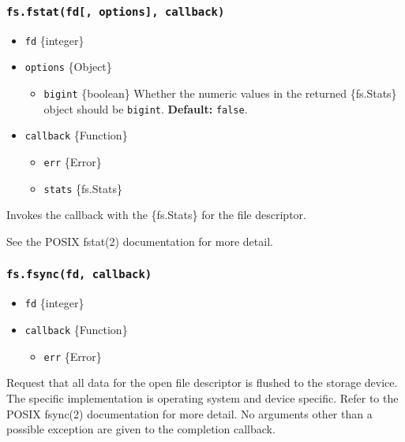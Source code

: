 \subsubsection{\texorpdfstring{\texttt{fs.fstat(fd{[},\ options{]},\ callback)}}{fs.fstat(fd{[}, options{]}, callback)}}\label{fs.fstatfd-options-callback}

\begin{itemize}
\tightlist
\item
  \texttt{fd} \{integer\}
\item
  \texttt{options} \{Object\}

  \begin{itemize}
  \tightlist
  \item
    \texttt{bigint} \{boolean\} Whether the numeric values in the
    returned \{fs.Stats\} object should be \texttt{bigint}.
    \textbf{Default:} \texttt{false}.
  \end{itemize}
\item
  \texttt{callback} \{Function\}

  \begin{itemize}
  \tightlist
  \item
    \texttt{err} \{Error\}
  \item
    \texttt{stats} \{fs.Stats\}
  \end{itemize}
\end{itemize}

Invokes the callback with the \{fs.Stats\} for the file descriptor.

See the POSIX fstat(2) documentation for more detail.

\subsubsection{\texorpdfstring{\texttt{fs.fsync(fd,\ callback)}}{fs.fsync(fd, callback)}}\label{fs.fsyncfd-callback}

\begin{itemize}
\tightlist
\item
  \texttt{fd} \{integer\}
\item
  \texttt{callback} \{Function\}

  \begin{itemize}
  \tightlist
  \item
    \texttt{err} \{Error\}
  \end{itemize}
\end{itemize}

Request that all data for the open file descriptor is flushed to the
storage device. The specific implementation is operating system and
device specific. Refer to the POSIX fsync(2) documentation for more
detail. No arguments other than a possible exception are given to the
completion callback.

